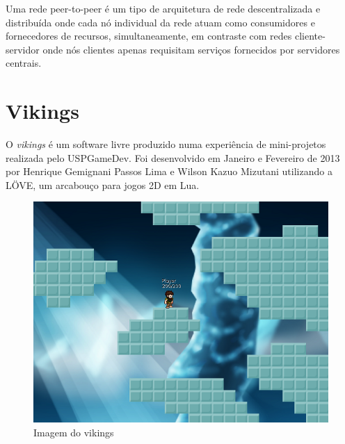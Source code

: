   Uma rede peer-to-peer é um tipo de arquitetura de rede descentralizada e distribuída
  onde cada nó individual da rede atuam como consumidores e fornecedores de recursos,
  simultaneamente, em contraste com redes cliente-servidor onde nós clientes apenas
  requisitam serviços fornecidos por servidores centrais. \cite{peertopeer:definition}

\section{Vikings}
\label{sec:conceitos:vikings}
  O \textit{vikings}\footnotemark{} é um software livre produzido numa experiência de mini-projetos realizada pelo USPGameDev\footnotemark. 
  Foi desenvolvido em Janeiro e Fevereiro de 2013 por Henrique Gemignani Passos Lima e Wilson Kazuo Mizutani 
  utilizando a LÖVE, um arcabouço para jogos 2D em Lua\footnotemark{}.
  
  \begin{figure}
    \includegraphics{imagens/vikings-1.png}
    \caption{Imagem do vikings}
  \end{figure}
  
  \addtocounter{footnote}{-3}


